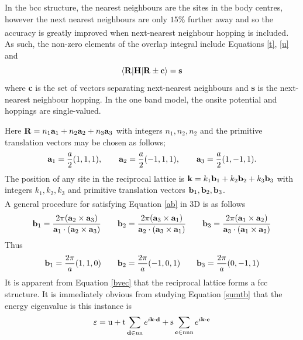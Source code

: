 \documentclass[a4paper, 12pt]{article}
\begin{document}
In the \gls{bcc} structure, the nearest neighbours are the sites in the body centres, however the next nearest neighbours are only $15\%$ further away and so the accuracy is greatly improved when next-nearest neighbour hopping is included\textsuperscript{\textcolor{blue}{\cite{harrison}}}.
As such, the non-zero elements of the overlap integral include Equations \eqref{t}, \eqref{u} and
		\begin{equation}\label{s}
			\langle{\bf R}|{\bf H}|{\bf R}\pm {\bf c}\rangle = \bf s
		\end{equation}
		where {\bf c} is the set of vectors separating next-nearest neighbours and {\bf s} is the next-nearest neighbour hopping. In the one band model, the onsite potential and hoppings are single-valued.

		Here ${\bf R} = n_1{\bf a}_1 + n_2{\bf a}_2 + n_3{\bf a}_3$ with integers $n_1,n_2,n_2$ and the primitive translation vectors may be chosen as follows;
		\begin{equation}
		{\bf a}_1 = \frac{a}{2}(1,1,1),\qquad {\bf a}_2 = \frac{a}{2}(-1,1,1),\qquad {\bf a}_3=\frac{a}{2}(1,-1,1). 
		\end{equation}
		The position of any site in the reciprocal lattice is ${\bf k} = k_1{\bf b}_1 + k_2{\bf b}_2 + k_3{\bf b}_3$ with integers $k_1,k_2,k_3$ and primitive translation vectors ${\bf b}_1,{\bf b}_2,{\bf b}_3$. 
		\\A general procedure for satisfying Equation \eqref{ab} in 3D is as follows\textsuperscript{\textcolor{blue}{\cite{datta}}}
		\begin{equation}
			{\bf b}_1 = \frac{2\pi({\bf a}_2 \times {\bf a}_3)}{{\bf a}_1\cdot ({\bf a}_2 \times {\bf a}_3)}
			\qquad {\bf b}_2 = \frac{2\pi({\bf a}_3 \times {\bf a}_1)}{{\bf a}_2\cdot ({\bf a}_3 \times {\bf a}_1)}
			\qquad {\bf b}_3 = \frac{2\pi({\bf a}_1 \times {\bf a}_2)}{{\bf a}_3\cdot ({\bf a}_1 \times {\bf a}_2)}
		\end{equation}
		Thus
		\begin{equation}\label{bvec}
			{\bf b}_1 = \frac{2\pi}{a}(1,1,0)\qquad {\bf b}_2 = \frac{2\pi}{a}(-1,0,1)\qquad {\bf b}_3 = \frac{2\pi}{a}(0,-1,1)
		\end{equation}
		It is apparent from Equation \eqref{bvec} that the reciprocal lattice forms a \gls{fcc} structure.
		It is immediately obvious from studying Equation \eqref{sumtb} that the energy eigenvalue is this instance is
		\begin{equation}\label{ebcc}
			\varepsilon = {\rm u} + {\rm t}\sum_{{\bf d}\in {\rm nn}} e^{i{\bf k \cdot d}} + {\rm s}\sum_{{\bf c}\in {\rm nnn}} e^{i{\bf k \cdot c}}
		\end{equation}
\end{document}
